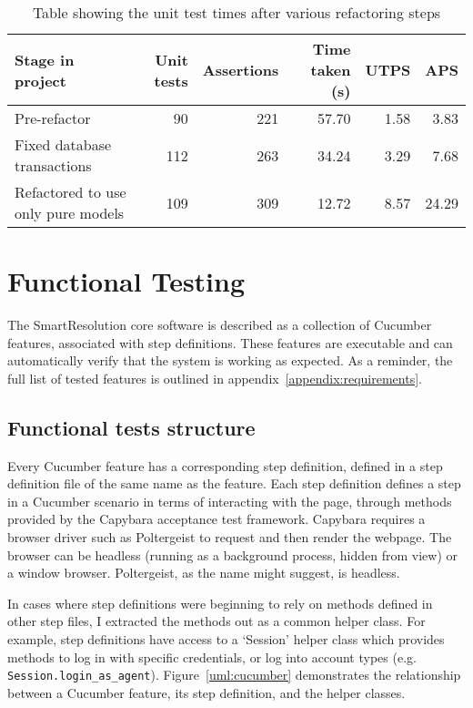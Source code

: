 \begin{table}[h!]
\label{table:testTimes}
\begin{center}
\begin{tabular}{ l | r | r | r | r | r}
  Stage in project & Unit tests & Assertions & Time taken (s) & UTPS & APS \\
  \hline
  Pre-refactor & 90 & 221 & 57.70 & 1.58 & 3.83\\
  Fixed database transactions & 112 & 263 & 34.24 & 3.29 & 7.68\\
  Refactored to use only pure models & 109 & 309 & 12.72 & 8.57 & 24.29
\end{tabular}
\end{center}
\caption {Table showing the unit test times after various refactoring steps}
\end{table}

\section{Functional Testing}

The SmartResolution core software is described as a collection of Cucumber features, associated with step definitions. These features are executable and can automatically verify that the system is working as expected. As a reminder, the full list of tested features is outlined in appendix~\ref{appendix:requirements}.

\subsection{Functional tests structure}

Every Cucumber feature has a corresponding step definition, defined in a step definition file of the same name as the feature. Each step definition defines a step in a Cucumber scenario in terms of interacting with the page, through methods provided by the Capybara acceptance test framework. Capybara requires a browser driver such as Poltergeist to request and then render the webpage. The browser can be headless (running as a background process, hidden from view) or a window browser. Poltergeist, as the name might suggest, is headless.

In cases where step definitions were beginning to rely on methods defined in other step files, I extracted the methods out as a common helper class. For example, step definitions have access to a `Session' helper class which provides methods to log in with specific credentials, or log into account types (e.g. \lstinline{Session.login_as_agent}). Figure~\ref{uml:cucumber} demonstrates the relationship between a Cucumber feature, its step definition, and the helper classes.

